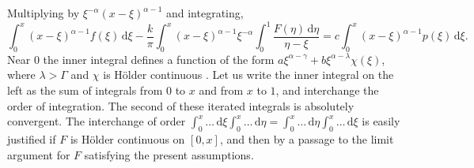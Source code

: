 \documentclass[leqno]{article}
\numberwithin{equation}{section}
\theoremstyle{plain}
\newcommand{\dd}{\,\mathrm{d}}
\begin{document}
Multiplying by $\xi^{-\alpha}(x-\xi)^{\alpha-1}$ and integrating,
\begin{equation*}
	\int_0^x (x-\xi)^{\alpha-1} f(\xi) \dd \xi - \frac{k}{\pi} \int_0^x (x-\xi)^{\alpha-1} \xi^{-\alpha} \int_0^1 \frac{F(\eta) \dd \eta}{\eta-\xi} = c \int_0^x (x-\xi)^{\alpha-1} p(\xi) \dd \xi.
\end{equation*}
Near $0$ the inner integral defines a function of the form $a\xi^{\alpha-\gamma} + b\xi^{\alpha-\lambda}\chi(\xi)$, where $\lambda > \Gamma$ and $\chi$ is Hölder continuous \cite[p.\ 75]{Mu}.
Let us write the inner integral on the left as the sum of integrals from $0$ to $x$ and from $x$ to $1$, and interchange the order of integration.
The second of these iterated integrals is absolutely convergent.
The interchange of order $\int_0^x \dotsc \dd \xi \int_0^x \dotsc \dd\eta  = \int_0^x \dotsc \dd \eta \int_0^x \dotsc \dd\xi$ is easily justified if $F$ is Hölder continuous on $[0,x]$, and then by a passage to the limit argument for $F$ satisfying the present assumptions.
\end{document}
